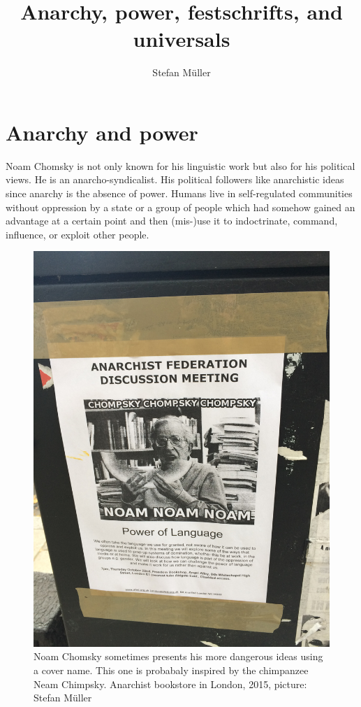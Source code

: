 \documentclass[output=paper,colorlinks,citecolor=brown]{langscibook}
\title{Anarchy, power, festschrifts, and universals}
\author{Stefan Müller\orcid{0000-0003-4413-5313}\affiliation{Humboldt-Universität zu Berlin}}
\begin{document}
\maketitle

\section{Anarchy and power} 

Noam Chomsky is not only known for his linguistic work but also for his political views. He is an
anarcho-syndicalist. His political followers like anarchistic ideas since anarchy is the absence of
power. Humans live in self-regulated communities without oppression by a state or a group of
people which had somehow gained an advantage at a certain point and then (mis-)use it to indoctrinate, command, influence, or
exploit other people.

\begin{figure}
\includegraphics[width=\linewidth]{figures/Chompsky-Anarchist-Bookstore-20151017-11-19-16.jpg}
\caption{Noam Chomsky sometimes presents his more dangerous ideas using a cover name. This one is
  probabaly inspired by the chimpanzee Neam Chimpsky. Anarchist
  bookstore in London, 2015, picture: Stefan Müller}
\end{figure}
\end{document}

